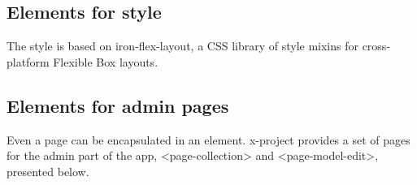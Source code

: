 \subsection{Elements for style}

The style is based on iron-flex-layout, a CSS library of style mixins for cross-platform Flexible Box layouts.

\subsection{Elements for admin pages}

Even a page can be encapsulated in an element. x-project provides a set of pages for the admin part of the app, <page-collection> and <page-model-edit>, presented below.